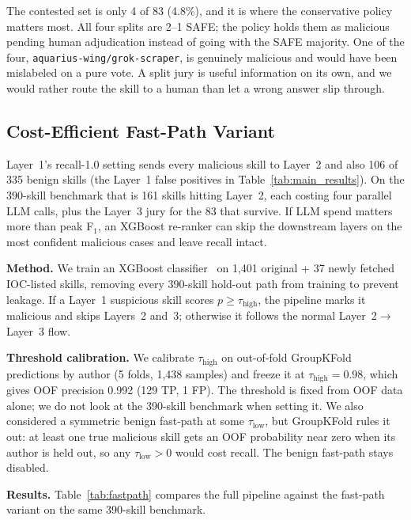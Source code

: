 \documentclass[sigconf,nonacm]{acmart}
\begin{document}
The contested set is only 4 of 83 (4.8\%), and it is where the conservative policy matters most. All four splits are 2--1 SAFE; the policy holds them as malicious pending human adjudication instead of going with the SAFE majority. One of the four, \texttt{aquarius-wing/grok-scraper}, is genuinely malicious and would have been mislabeled on a pure vote. A split jury is useful information on its own, and we would rather route the skill to a human than let a wrong answer slip through.

\subsection{Cost-Efficient Fast-Path Variant}
\label{sec:fastpath}

Layer~1's recall-1.0 setting sends every malicious skill to Layer~2 and also 106 of 335 benign skills (the Layer~1 false positives in Table~\ref{tab:main_results}). On the 390-skill benchmark that is 161 skills hitting Layer~2, each costing four parallel LLM calls, plus the Layer~3 jury for the 83 that survive. If LLM spend matters more than peak F$_1$, an XGBoost re-ranker can skip the downstream layers on the most confident malicious cases and leave recall intact.

\textbf{Method.} We train an XGBoost classifier~\cite{chen2016xgboost} on 1{,}401 original + 37 newly fetched IOC-listed skills, removing every 390-skill hold-out path from training to prevent leakage. If a Layer~1 suspicious skill scores $p \geq \tau_{\text{high}}$, the pipeline marks it malicious and skips Layers~2 and~3; otherwise it follows the normal Layer~2$\to$Layer~3 flow.

\textbf{Threshold calibration.} We calibrate $\tau_{\text{high}}$ on out-of-fold GroupKFold predictions by author (5 folds, 1,438 samples) and freeze it at $\tau_{\text{high}} = 0.98$, which gives OOF precision 0.992 (129 TP, 1 FP). The threshold is fixed from OOF data alone; we do not look at the 390-skill benchmark when setting it. We also considered a symmetric benign fast-path at some $\tau_{\text{low}}$, but GroupKFold rules it out: at least one true malicious skill gets an OOF probability near zero when its author is held out, so any $\tau_{\text{low}} > 0$ would cost recall. The benign fast-path stays disabled.

\textbf{Results.} Table~\ref{tab:fastpath} compares the full pipeline against the fast-path variant on the same 390-skill benchmark.
\end{document}
